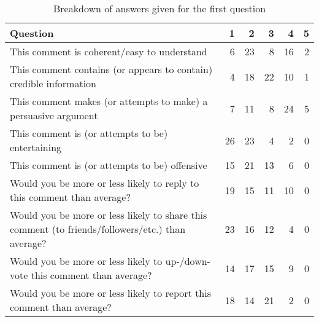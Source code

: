 \begin{table}
\centering
\caption{Breakdown of answers given for the first question}
\label{table:perception:first-raw}
\begin{tabular}{ p{6cm} | r | r | r | r | r }
\textbf{Question} & \textbf{1} &  \textbf{2} &  \textbf{3} &  \textbf{4} &  \textbf{5}\\
\hline
This comment is coherent/easy to understand  &  6 & 23 & 8 & 16 & 2 \\
\hline
This comment contains (or appears to contain) credible information  &  4 & 18 & 22 & 10 & 1 \\
\hline
This comment makes (or attempts to make) a persuasive argument  &  7 & 11 & 8 & 24 & 5 \\
\hline
This comment is (or attempts to be) entertaining  &  26 & 23 & 4 & 2 & 0 \\
\hline
This comment is (or attempts to be) offensive  &  15 & 21 & 13 & 6 & 0 \\
\hline
Would you be more or less likely to reply to this comment than average?  &  19 & 15 & 11 & 10 & 0 \\
\hline
Would you be more or less likely to share this comment (to friends/followers/etc.) than average?  &  23 & 16 & 12 & 4 & 0 \\
\hline
Would you be more or less likely to up-/down-vote this comment than average?  &  14 & 17 & 15 & 9 & 0 \\
\hline
Would you be more or less likely to report this comment than average?  &  18 & 14 & 21 & 2 & 0 \\
\end{tabular}
\end{table}


